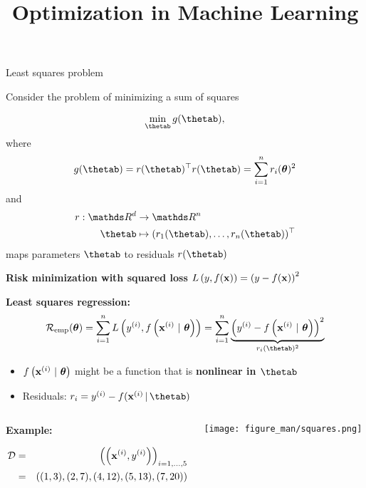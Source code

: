 \documentclass[11pt,compress,t,notes=noshow, xcolor=table]{beamer}
\title{Optimization in Machine Learning}
\date{}
\begin{document}
\lecture{\inserttitle}
\sloppy

\begin{vbframe}{Least squares problem}

Consider the problem of minimizing a sum of squares

\begin{equation*}
	\min_{\thetab} g(\thetab),
\end{equation*}
where
\begin{equation*}
    g(\thetab) = r(\thetab)^\top r(\thetab) = \sum_{i = 1}^n r_i(\bm{\theta})^2
\end{equation*}
and
\begin{align*}
	r: \R^d &\to \R^n \\
	\thetab &\mapsto (r_1(\thetab), \ldots, r_n(\thetab))^\top
\end{align*}
maps parameters $\thetab$ to residuals $r(\thetab)$

\framebreak 

\textbf{Risk minimization with squared loss} $L\left(y, f(\mathbf{x})\right) = \left(y - f(\mathbf{x})\right)^2$

\medskip

\textbf{Least squares regression:}
\begin{equation*}
    \risket = \sumin \Lxyit = \sumin \underbrace{\left(\yi - \fxit \right)^2}_{r_i(\thetab)^2}
\end{equation*}

\begin{itemize}
    \item $f\left(\mathbf{x}^{(i)} ~|~ \bm{\theta}\right)$ might be a function that is \textbf{nonlinear in $\thetab$}
    \item Residuals: $r_i = y^{(i)} - f(\xv^{(i)} \,|\, \thetab)$
\end{itemize}

\vspace*{0.3cm} 

\begin{columns}
\begin{column}{0.55\textwidth}
\textbf{Example:} 

\begin{footnotesize}
\begin{eqnarray*}
\mathcal{D} &=& \left(\left(\mathbf{x}^{(i)}, y^{(i)}\right)\right)_{i = 1, ..., 5} \\ &=& \left((1,3),(2,7),(4,12),(5,13),(7,20)\right)
\end{eqnarray*}
\end{footnotesize}
\end{column}
\begin{column}{0.4\textwidth}
	\vspace*{-0.5cm}  
    \begin{center}
     \texttt{[image: figure\_man/squares.png]}
     \end{center}
\end{column}
\end{columns}



\end{vbframe}
\end{document}
